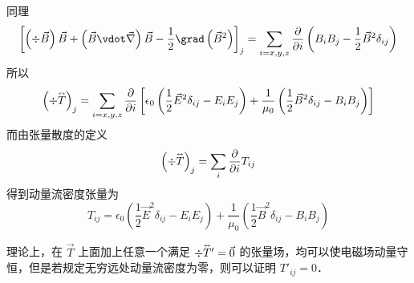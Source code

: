 同理
\begin{equation}
{\left[ {\left( {\div \vec B} \right)\vec B + \left( {\vec B\vdot\vec\nabla } \right)\vec B - \frac{1}{2}\grad \left( {{{\vec B}^2}} \right)} \right]_j} = \sum\limits_{i = x,y,z} {\frac{\partial }{{\partial i}}\left( {{B_i}{B_j} - \frac{1}{2}{{\vec B}^2}{\delta _{ij}}} \right)} 
\end{equation} 
所以
\begin{equation}
{\left( {\div \mathord{\buildrel{\lower3pt\hbox{$\scriptscriptstyle\leftrightarrow$}} 
\over T} } \right)_j} = \sum\limits_{i = x,y,z} {\frac{\partial }{{\partial i}}\left[ {{\epsilon_0}\left( {\frac{1}{2}{{\vec E}^2}{\delta _{ij}} - {E_i}{E_j}} \right) + \frac{1}{{{\mu _0}}}\left( {\frac{1}{2}{{\vec B}^2}{\delta _{ij}} - {B_i}{B_j}} \right)} \right]} 
\end{equation} 
而由张量散度的定义
\begin{equation}
{\left( {\div \mathord{\buildrel{\lower3pt\hbox{$\scriptscriptstyle\leftrightarrow$}} 
\over T} } \right)_j} = \sum\limits_i {\frac{\partial }{{\partial i}}{T_{ij}}} 
\end{equation} 
得到动量流密度张量为
\begin{equation}
{T_{ij}} = {\epsilon_0}\left( {\frac{1}{2}{{\vec E}^2}{\delta _{ij}} - {E_i}{E_j}} \right) + \frac{1}{{{\mu _0}}}\left( {\frac{1}{2}{{\vec B}^2}{\delta _{ij}} - {B_i}{B_j}} \right)
\end{equation} 

理论上，在 $\vec T$ 上面加上任意一个满足 $\div \mathord{\buildrel{\lower3pt\hbox{$\scriptscriptstyle\leftrightarrow$}} 
\over T}{}'  = \vec 0$ 的张量场，均可以使电磁场动量守恒，但是若规定无穷远处动量流密度为零，则可以证明 ${T'_{ij}} = 0$． 
 
 
 